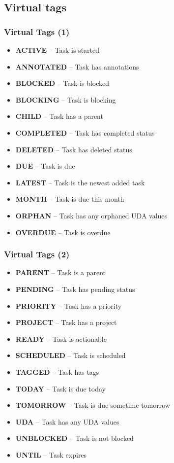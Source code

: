 \documentclass[t,handout,aspectratio=169]{beamer}
\begin{document}
\subsection{Virtual tags}

\begin{frame}[fragile]\frametitle{Virtual Tags (1)}
    \vfill
    \begin{itemize}
        \item \textbf{ACTIVE}       -- Task is started
        \item \textbf{ANNOTATED}    -- Task has annotations
        \item \textbf{BLOCKED}      -- Task is blocked
        \item \textbf{BLOCKING}     -- Task is blocking
        \item \textbf{CHILD}        -- Task has a parent
        \item \textbf{COMPLETED}    -- Task has completed status
        \item \textbf{DELETED}      -- Task has deleted status
        \item \textbf{DUE}          -- Task is due
        \item \textbf{LATEST}       -- Task is the newest added task
        \item \textbf{MONTH}        -- Task is due this month
        \item \textbf{ORPHAN}       -- Task has any orphaned UDA values
        \item \textbf{OVERDUE}      -- Task is overdue
    \end{itemize}
\end{frame}

\begin{frame}[fragile]\frametitle{Virtual Tags (2)}
    \vfill
    \begin{itemize}
        \item \textbf{PARENT}       -- Task is a parent
        \item \textbf{PENDING}      -- Task has pending status
        \item \textbf{PRIORITY}     -- Task has a priority
        \item \textbf{PROJECT}      -- Task has a project
        \item \textbf{READY}        -- Task is actionable
        \item \textbf{SCHEDULED}    -- Task is scheduled
        \item \textbf{TAGGED}       -- Task has tags
        \item \textbf{TODAY}        -- Task is due today
        \item \textbf{TOMORROW}     -- Task is due sometime tomorrow
        \item \textbf{UDA}          -- Task has any UDA values
        \item \textbf{UNBLOCKED}    -- Task is not blocked
        \item \textbf{UNTIL}        -- Task expires
    \end{itemize}
\end{frame}
\end{document}
